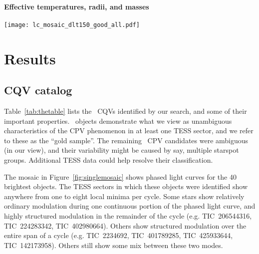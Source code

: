 \documentclass[11pt,twocolumn,tighten]{aastex63}
\begin{document}
\paragraph{Effective temperatures, radii, and masses}


\begin{figure*}[!t]
	\begin{center}
		\centering
		\texttt{[image: lc\_mosaic\_dlt150\_good\_all.pdf]}
		\caption{
			{\bf CQVs from a search of the TESS 2-minute data at
				$d$$<$150\,pc, acquired between July~2018 and Sep~2022.}
			Phased TESS light curves over 1 month are shown for 40 CQVs;
			they include the brightest and closest examples of CQVs known
			($V$=14; $J$=9.5; $d$=25\,pc).  Gray are raw 2-minute data;
			black bins to 300 points per cycle.  Periods in hours are listed
			in the lower right corners of each panel.
			{\bf todo:  add TIC IDs and sector numbers}.
		}
		\label{fig:singlemosaic}
	\end{center}
\end{figure*}


\section{Results}
\label{sec:results}

\subsection{CQV catalog}

Table~\ref{tab:thetable} lists the \ncpvsfound\ CQVs identified by our
search, and some of their important properties.  \ngoods\ objects
demonstrate what we view as unambiguous characteristics of the CPV
phenomenon in at least one TESS sector, and we refer to these as the
``gold sample''.  The remaining \nmaybes\ CPV candidates were
ambiguous (in our view), and their variability might be caused by say,
multiple starspot groups.  Additional TESS data could help resolve
their classification.

The mosaic in Figure~\ref{fig:singlemosaic} shows phased light curves
for the 40 brightest objects.  The TESS sectors in which these objects
were identified show anywhere from one to eight local minima per
cycle.  Some stars show relatively ordinary modulation during one
continuous portion of the phased light curve, and highly structured
modulation in the remainder of the cycle (e.g. TIC~206544316,
TIC~224283342, TIC~402980664).  Others show structured modulation over
the entire span of a cycle (e.g. TIC~2234692, TIC~401789285,
TIC~425933644, TIC~142173958).  Others still show some mix between
these two modes.
\end{document}
